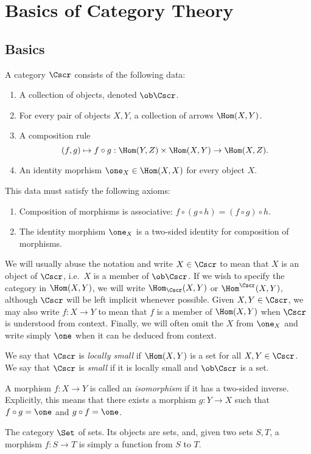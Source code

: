 \chapter{Basics of Category Theory}

\section{Basics}
A category $\Cscr$ consists of the following data:
\begin{enumerate}
  \item A collection of objects, denoted $\ob\Cscr$.
  \item For every pair of objects $X,Y$, a collection of arrows $\Hom(X,Y)$.
  \item A composition rule
        \[ (f,g) \mapsto f \circ g : \Hom(Y,Z) \times \Hom(X,Y) \to \Hom(X,Z). \]
  \item An identity moprhism $\one_{X} \in \Hom(X,X)$ for every object $X$.
\end{enumerate}
This data must satisfy the following axioms:
\begin{enumerate}
  \item Composition of morphisms is associative: $f \circ (g \circ h) = (f \circ g) \circ h$.
  \item The identity morphism $\one_{X}$ is a two-sided identity for composition of morphisms.
\end{enumerate}
We will usually abuse the notation and write $X \in \Cscr$ to mean that $X$ is an object of $\Cscr$, i.e.~$X$ is a member of $\ob\Cscr$.
If we wish to specify the category in $\Hom(X,Y)$, we will write $\Hom_{\Cscr}(X,Y)$ or $\Hom^{\Cscr}(X,Y)$, although $\Cscr$ will be left implicit whenever possible.
Given $X,Y \in \Cscr$, we may also write $f : X \to Y$ to mean that $f$ is a member of $\Hom(X,Y)$ when $\Cscr$ is understood from context.
Finally, we will often omit the $X$ from $\one_{X}$ and write simply $\one$ when it can be deduced from context.

We say that $\Cscr$ is \emph{locally small} if $\Hom(X,Y)$ is a set for all $X,Y \in \Cscr$.
We say that $\Cscr$ is \emph{small} if it is locally small and $\ob \Cscr$ is a set.

A morphism $f : X \to Y$ is called an \emph{isomorphism} if it has a two-sided inverse.
Explicitly, this means that there exists a morphism $g : Y \to X$ such that $f \circ g = \one$ and $g \circ f = \one$.

\begin{example}
  The category $\Set$ of sets.
  Its objects are sets, and, given two sets $S,T$, a morphism $f : S \to T$ is simply a function from $S$ to $T$.
\end{example}

